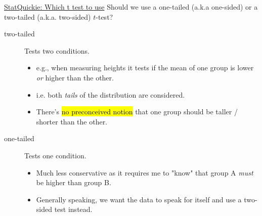 \documentclass[12pt, titlepage, french]{report}
\begin{document}
\begin{YTB_SUMM_AUTO_NUMB}[label = {SQ-ttest-use}]{\href{https://www.youtube.com/watch?v=nnBJeb_I-q8}{StatQuickie: Which t test to use}}
Should we use a one-tailed (a.k.a one-sided) or a two-tailed (a.k.a. two-sided) $t$-test?\\
\begin{description}
	\item[two-tailed]	Tests two conditions.
		\begin{itemize}
		\item	e.g., when measuring heights it tests if the mean of one group is lower \textit{or} higher than the other.
		\item	i.e. both \textit{tails} of the distribution are considered.
		\item	There's \hl{no preconceived notion} that one group should be taller / shorter than the other.
		\end{itemize}
	\item[one-tailed]	Tests one condition.
		\begin{itemize}
		\item	Much less conservative as it requires me to "know" that group A \textit{must} be higher than group B.
		\item	Generally speaking, we want the data to speak for itself and use a two-sided test instead.
		\end{itemize}
\end{description}
\end{YTB_SUMM_AUTO_NUMB}
\end{document}
